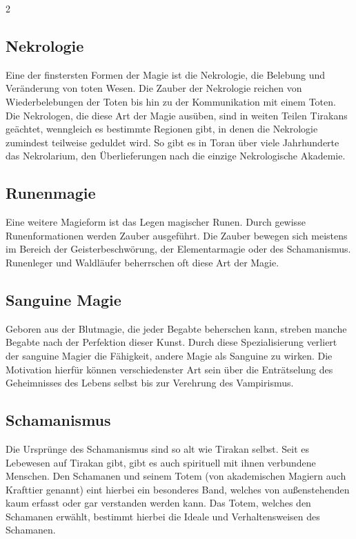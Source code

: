 \begin{multicols*}{2}
\subsection{Nekrologie}\label{subsec:nekrologie}

Eine der finstersten Formen der Magie ist die Nekrologie, die Belebung und Veränderung von toten Wesen.
Die Zauber der Nekrologie reichen von Wiederbelebungen der Toten bis hin zu der Kommunikation mit einem Toten.
Die Nekrologen, die diese Art der Magie ausüben, sind in weiten Teilen Tirakans geächtet, wenngleich es bestimmte Regionen gibt, in denen die Nekrologie zumindest teilweise geduldet wird.
So gibt es in Toran über viele Jahrhunderte das Nekrolarium, den Überlieferungen nach die einzige Nekrologische Akademie.

\subsection{Runenmagie}\label{subsec:runenmagie}

Eine weitere Magieform ist das Legen magischer Runen.
Durch gewisse Runenformationen werden Zauber ausgeführt.
Die Zauber bewegen sich meistens im Bereich der Geisterbeschwörung, der Elementarmagie oder des Schamanismus.
Runenleger und Waldläufer beherrschen oft diese Art der Magie.

\subsection{Sanguine Magie}\label{subsec:sanguine-magie}

Geboren aus der Blutmagie, die jeder Begabte beherschen kann, streben manche Begabte nach der Perfektion dieser Kunst.
Durch diese Spezialisierung verliert der sanguine Magier die Fähigkeit, andere Magie als Sanguine zu wirken.
Die Motivation hierfür können verschiedenster Art sein über die Enträtselung des Geheimnisses des Lebens selbst bis zur Verehrung des Vampirismus.

\subsection{Schamanismus}\label{subsec:schamanismus}

Die Ursprünge des Schamanismus sind so alt wie Tirakan selbst.
Seit es Lebewesen auf Tirakan gibt, gibt es auch spirituell mit ihnen verbundene Menschen.
Den Schamanen und seinem Totem (von akademischen Magiern auch Krafttier genannt) eint hierbei ein besonderes Band, welches von außenstehenden kaum erfasst oder gar verstanden werden kann.
Das Totem, welches den Schamanen erwählt, bestimmt hierbei die Ideale und Verhaltensweisen des Schamanen.


\end{multicols*}
